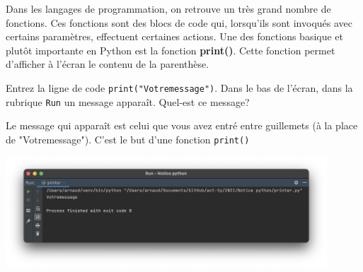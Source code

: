 Dans les langages de programmation, on retrouve un très grand nombre de fonctions. Ces fonctions sont des blocs de code qui, lorsqu'ils sont invoqués avec certains paramètres, effectuent certaines actions. Une des fonctions basique et plutôt importante en Python est la fonction \textbf{print()}.  Cette fonction permet d'afficher à l'écran le contenu de la parenthèse.
\\
\begin{Exercice}[5 minutes]

Entrez la ligne de code \lstinline{print("Votremessage")}. Dans le bas de l'écran, dans la rubrique \lstinline{Run} un message apparaît. Quel-est ce message?

\begin{solution}

Le message qui apparaît est celui que vous avez entré entre guillemets (à la place de "Votremessage"). C'est le but d'une fonction \lstinline{print()}
\begin{center}
\includegraphics[width=12cm]{print.png}	
\end{center}

\end{solution}
\end{Exercice}

